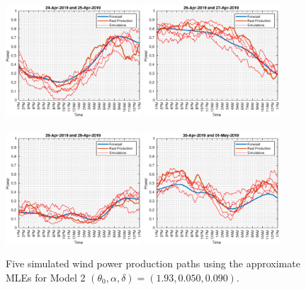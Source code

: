\documentclass[11pt]{article}
\theoremstyle{definition}
\begin{document}
\begin{figure}[H]
\centering
\includegraphics[width=0.45\textwidth]{../../MATLAB_Files/Results/paths_testing_days/optimal_value/1.eps}
\includegraphics[width=0.45\textwidth]{../../MATLAB_Files/Results/paths_testing_days/optimal_value/2.eps}\\
\quad\\
\includegraphics[width=0.45\textwidth]{../../MATLAB_Files/Results/paths_testing_days/optimal_value/3.eps}
\includegraphics[width=0.45\textwidth]{../../MATLAB_Files/Results/paths_testing_days/optimal_value/4.eps}
\caption{Five simulated wind power production paths using the approximate MLEs for Model 2 $(\theta_0, \alpha ,\delta)=(1.93,0.050,0.090)$. }
\label{fig:simulation_paths}
\end{figure}
\end{document}
